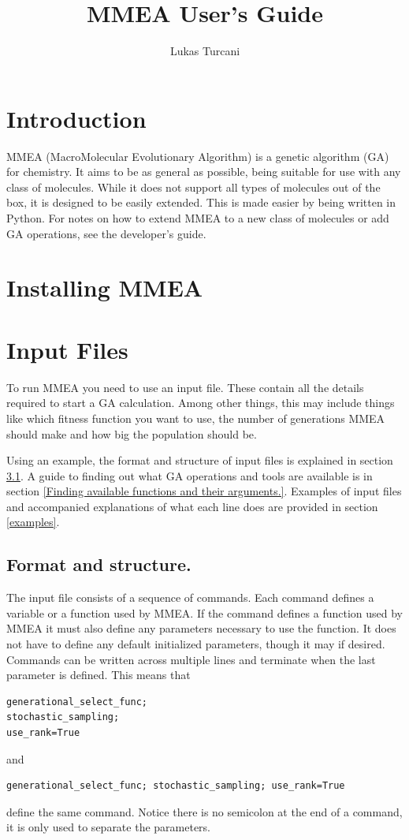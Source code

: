 \documentclass[12pt]{article}
\title{MMEA User's Guide}
\author{Lukas Turcani}
\begin{document}
\begin{titlepage}
	\maketitle
\end{titlepage}

\tableofcontents
\newpage
\section{Introduction}
MMEA (MacroMolecular Evolutionary Algorithm) is a genetic algorithm (GA) for chemistry. It aims to be as general as possible, being suitable for use with any class of molecules. While it does not support all types of molecules out of the box, it is designed to be easily extended. This is made easier by being written in Python. For notes on how to extend MMEA to a new class of molecules or add GA operations, see the developer's guide.

\section{Installing MMEA}

\section{Input Files}
To run MMEA you need to use an input file. These contain all the details required to start a GA calculation. Among other things, this may include things like which fitness function you want to use, the number of generations MMEA should make and how big the population should be.

Using an example, the format and structure of input files is explained in section \ref{input_files_format_and_structure}. A guide to finding out what GA operations and tools are available is in section \ref{Finding available functions and their arguments.}. Examples of input files and accompanied explanations of what each line does are provided in section \ref{examples}.

\subsection{Format and structure.}
\label{input_files_format_and_structure}

The input file consists of a sequence of commands. Each command defines a variable or a function used by MMEA. If the command defines a function used by MMEA it must also define any parameters necessary to use the function. It does not have to define any default initialized parameters, though it may if desired. Commands can be written across multiple lines and terminate when the last parameter is defined. This means that 
\begin{Verbatim}
generational_select_func; 
stochastic_sampling; 
use_rank=True
\end{Verbatim}
and
\begin{Verbatim}
generational_select_func; stochastic_sampling; use_rank=True
\end{Verbatim}
define the same command. Notice there is no semicolon at the end of a command, it is only used to separate the parameters.
\end{document}
